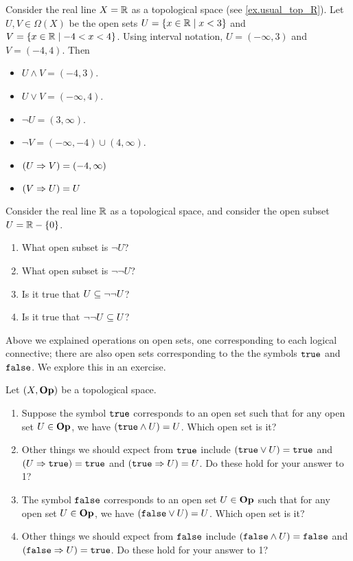 \documentclass[7Sketches]{subfiles}
\begin{document}
\begin{example}
Consider the real line $X=\RR$ as a topological space (see \cref{ex.usual_top_R}). Let $U,V\in\Omega(X)$ be the open sets $U=\{x\in\RR\mid x<3\}$ and $V=\{x\in\RR\mid -4< x < 4\}$. Using interval notation, $U=(-\infty,3)$ and $V=(-4,4)$. Then
\begin{itemize}
	\item $U\wedge V=(-4,3)$.
	\item $U\vee V=(-\infty,4)$.
	\item $\neg U=(3,\infty)$.
	\item $\neg V=(-\infty,-4)\cup(4,\infty)$.
	\item $(U\imp V)=(-4,\infty)$
	\item $(V\imp U)=U$
	\qedhere
\end{itemize}
\end{example}

\begin{exercise}%
\label{exc.real_line_logic}
Consider the real line $\RR$ as a topological space, and consider the open subset $U=\RR-\{0\}$.
\begin{enumerate}
	\item What open subset is $\neg U$?
	\item What open subset is $\neg\neg U$?
	\item Is it true that $U\ss\neg\neg U$?
	\item Is it true that $\neg\neg U\ss U$?
	\qedhere
\end{enumerate}	
\end{exercise}

Above we explained operations on open sets, one corresponding to each logical connective; there are also open sets corresponding to the the symbols $\true$ and $\false$. We explore this in an exercise.

\begin{exercise}%
\label{exc.top_bot_practice}
Let $(X,\Op)$ be a topological space.
\begin{enumerate}
	\item Suppose the symbol $\true$ corresponds to an open set such that for any open set $U\in\Op$, we have $(\true\wedge U)=U$. Which open set is it?
	\item Other things we should expect from $\true$ include $(\true\vee U)=\true$ and $(U\imp \true)=\true$ and $(\true\imp U)=U$. Do these hold for your answer to 1?
	\item The symbol $\false$ corresponds to an open set $U\in\Op$ such that for any open set $U\in\Op$, we have $(\false\vee U)=U$. Which open set is it?
	\item Other things we should expect from $\false$ include $(\false\wedge U)=\false$ and $(\false\imp U)=\true$. Do these hold for your answer to 1?
	\qedhere
\end{enumerate} 
\end{exercise} 
\end{document}
